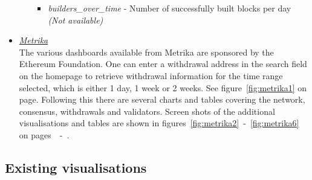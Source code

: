 \documentclass[UTF8]{article}
\begin{document}
\begin{itemize}
\begin{itemize}
\begin{itemize}
			\item \textit{builders\_over\_time} - Number of successfully built blocks per day \textit{(Not available)}
		\end{itemize}
	\end{itemize}
	\item \textit{\href{https://app.metrika.co/ethereum/}{Metrika}} \\
	The various dashboards available from Metrika are sponsored by the Ethereum Foundation. One can enter a withdrawal address in the search field on the homepage to retrieve withdrawal information for the time range selected, which is either 1 day, 1 week or 2 weeks. See figure~\ref{fig:metrika1} on page\pageref{fig:metrika1}. Following this there are several charts and tables covering the network, consensus, withdrawals and validators. Screen shots of the additional visualisations and tables are shown in figures~\ref{fig:metrika2}~-~\ref{fig:metrika6} on pages~\pageref{fig:metrika2}~-~\pageref{fig:metrika6}.

\end{itemize}

\clearpage

\subsection{Existing visualisations}
\end{document}
